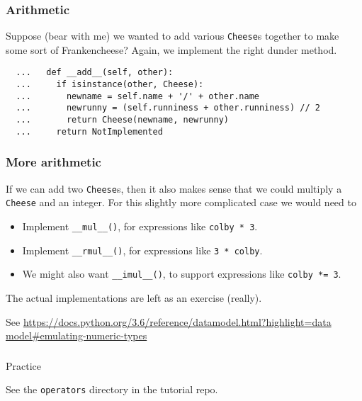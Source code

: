 \documentclass[aspectratio=169]{beamer}
\begin{document}
\begin{frame}[fragile]
  \frametitle{Arithmetic} 
  
  Suppose (bear with me) we wanted to add various \texttt{Cheese}s together to make some sort of Frankencheese? Again, we implement the 
  right dunder method.  
  
  \begin{verbatim}
  ...   def __add__(self, other):
  ...     if isinstance(other, Cheese):
  ...       newname = self.name + '/' + other.name
  ...       newrunny = (self.runniness + other.runniness) // 2  
  ...       return Cheese(newname, newrunny) 
  ...     return NotImplemented
  \end{verbatim}
   \end{frame}
 
\begin{frame}[fragile]
  \frametitle{More arithmetic} 
  
  If we can add two \texttt{Cheese}s, then it also makes sense that we could multiply a \texttt{Cheese} and an integer.  For this slightly more complicated case we would need to 
  \bigbreak
  
  \begin{itemize}
    \item Implement \texttt{\_\_mul\_\_()}, for expressions like \texttt{colby * 3}. 
    \item Implement \texttt{\_\_rmul\_\_()}, for expressions like \texttt{3 * colby}.
    \item We might also want \texttt{\_\_imul\_\_()}, to support expressions like \texttt{colby *= 3}.
  \end{itemize}
  \bigbreak
  
  The actual implementations are left as an exercise (really). 
  
  \bigbreak
  See \url{https://docs.python.org/3.6/reference/datamodel.html?highlight=data model#emulating-numeric-types}
  \end{frame}
 
\begin{frame}
  \frametitle{} 
   
   \centerline{\huge Practice} 
   \centerline{See the \texttt{operators} directory in the tutorial repo.} 
   
   \end{frame}
\end{document}
